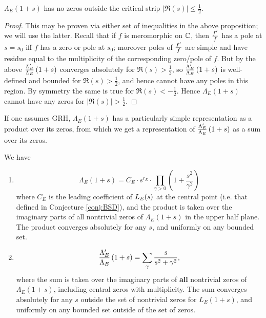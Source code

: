 \begin{corollary}
$\Lambda_E(1+s)$ has no zeros outside the critical strip $|\Re(s)| \le \frac{1}{2}$.
\end{corollary}
\begin{proof}
This may be proven via either set of inequalities in the above proposition; we will use the latter. Recall that if $f$ is meromorphic on $\mathbb{C}$, then $\frac{f^{\prime}}{f}$ has a pole at $s=s_0$ iff $f$ has a zero or pole at $s_0$; moreover poles of $\frac{f^{\prime}}{f}$ are simple and have residue equal to the multiplicity of the corresponding zero/pole of $f$. But by the above $\frac{L_E^{\prime}}{L_E}\left(1+s\right)$ converges absolutely for $\Re(s)>\frac{1}{2}$, so $\frac{\Lambda_E^{\prime}}{\Lambda_E}\left(1+s\right)$ is well-defined and bounded for $\Re(s)>\frac{1}{2}$, and hence cannot have any poles in this region. By symmetry the same is true for $\Re(s)<-\frac{1}{2}$. Hence $\Lambda_E(1+s)$ cannot have any zeros for $|\Re(s)| > \frac{1}{2}$.
\end{proof}

If one assumes GRH, $\Lambda_E(1+s)$ has a particularly simple representation as a product over its zeros, from which we get a representation of $\frac{\Lambda_E^{\prime}}{\Lambda_E}\left(1+s\right)$ as a sum over its zeros.
\begin{proposition}[GRH]
\label{prop:logderiv_zero_rep} We have
\begin{enumerate}
\item \begin{equation}\label{eqn:Lams_prod}
\Lambda_E(1+s) = C_E\cdot s^{r_E} \cdot \prod_{\gamma > 0} \left(1+\frac{s^2}{\gamma^2}\right) 
\end{equation}
where $C_E$ is the leading coefficient of $L_E(s)$ at the central point (i.e. that defined in Conjecture \ref{conj:BSD}), and the product is taken over the imaginary parts of all nontrivial zeros of $\Lambda_E(1+s)$ in the upper half plane. The product converges absolutely for any $s$, and uniformly on any bounded set.
\item \begin{equation}\label{eqn:ldLam_sum}
\frac{\Lambda_E^{\prime}}{\Lambda_E}\left(1+s\right) = \sum_{\gamma} \frac{s}{s^2+\gamma^2}, 
\end{equation}
where the sum is taken over the imaginary parts of {\bf all} nontrivial zeros of $\Lambda_E(1+s)$, including central zeros with multiplicity. The sum converges absolutely for any $s$ outside the set of nontrivial zeros for $L_E(1+s)$, and uniformly on any bounded set outside of the set of zeros. \\
\end{enumerate}
\end{proposition}

